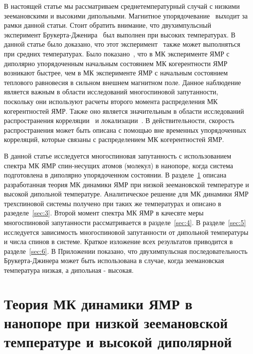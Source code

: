 \documentclass[utf8]{jetp}
\begin{document}
В настоящей статье мы рассматриваем среднетемпературный случай с низкими зеемановскими и высокими дипольными.
Магнитное упорядочевание~\cite{Abragam_1982} выходит за рамки данной статьи.
Стоит обратить внимание, что двухимпульсный эксперимент     Брукерта-Дженира~\cite{Jeener_1967} был выполнен при высоких температурах.
В данной статье было доказано, что этот эксперимент~\cite{Jeener_1967} также может выполняться при средних температурах.  
Было показано~\cite{Doronin_2011}, что в МК эксперименте ЯМР с диполярно упорядоченным начальным состоянием МК когерентности ЯМР возникают быстрее, 
чем в МК эксперименте ЯМР с начальным состоянием теплового равновесия в сильном внешнем магнитном поле.
Данное наблюдение является важным в области исследований многоспиновой запутанности, поскольку они используют расчеты второго момента распределения МК когерентностей ЯМР. 
Также оно является значительным в области исследований распространения корреляции~\cite{Baugh_2001,Baum_1986,S_nchez_2014,Munowitz_1987} и локализации~\cite{Alvarez_2015,Wei_2018}.
В действительности, скорость распространения может быть описана с помощью вне временных упорядоченных корреляций, которые связаны с распределением МК когерентностей ЯМР.

В данной статье исследуется многоспиновая запутанность с использованием спектра МК ЯМР спин-несущих атомов (молекул) в нанопоре, когда система подготовлена в диполярно упорядоченном состоянии.
В разделе~\ref{sec:2} описана разработанная теория МК динамики ЯМР при низкой зеемановской температуре и высокой дипольной температуре.
Аналитическое решение для МК динамики ЯМР трехспиновой системы получено при таких же температурах и описано в разеделе~\ref{sec:3}.
Второй момент спектра МК ЯМР в качесвте меры многоспиновой запутанности рассматривается в разделе~\ref{sec:4}.
В разделе~\ref{sec:5} исследуется зависимость многоспиновой запутанности от дипольной температуры и числа спинов в системе.
Краткое изложение всех результатов приводится в разделе~\ref{sec:6}.
В Приложении показано, что двухимпульсная последовательность Брукерта-Джинера может быть использована в случае, когда зеемановская температура низкая, а дипольная - высокая.



\section{Теория МК динамики ЯМР в нанопоре при низкой зеемановской температуре и высокой диполярной}
\label{sec:2}
\end{document}

